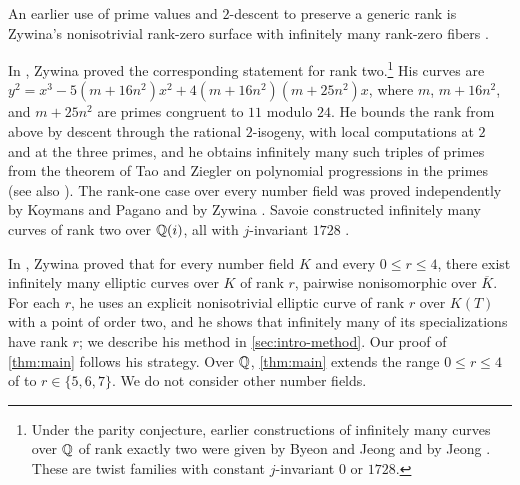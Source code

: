 An earlier use of prime values and $2$-descent to preserve a generic rank is Zywina's nonisotrivial rank-zero surface with infinitely many rank-zero fibers \cite[Theorem~1.2]{ZywinaNoJumps2025}.

In \cite{Zywina2025}, Zywina proved the corresponding statement for rank two.\footnote{Under the parity conjecture, earlier constructions of infinitely many curves over $\mathbb Q$ of rank exactly two were given by Byeon and Jeong \cite[Theorem~1.1]{ByeonJeong2016} and by Jeong \cite[Theorem~1.1]{Jeong2019}. These are twist families with constant $j$-invariant $0$ or $1728$.} His curves are $y^2=x^3-5(m+16n^2)x^2+4(m+16n^2)(m+25n^2)x$, where $m$, $m+16n^2$, and $m+25n^2$ are primes congruent to $11$ modulo $24$. He bounds the rank from above by descent through the rational $2$-isogeny, with local computations at $2$ and at the three primes, and he obtains infinitely many such triples of primes from the theorem of Tao and Ziegler on polynomial progressions in the primes \cite[Theorem~1.3]{TaoZiegler2008} (see also \cite{TaoZieglerErratum2013}). The rank-one case over every number field was proved independently by Koymans and Pagano \cite{KoymansPagano2025} and by Zywina \cite{ZywinaRankOne2025}. Savoie constructed infinitely many curves of rank two over $\mathbb Q(i)$, all with $j$-invariant $1728$ \cite{Savoie2025}.

In \cite[Theorem~1.1]{Zywina2026}, Zywina proved that for every number field $K$ and every $0\le r\le 4$, there exist infinitely many elliptic curves over $K$ of rank $r$, pairwise nonisomorphic over $\overline K$. For each $r$, he uses an explicit nonisotrivial elliptic curve of rank $r$ over $K(T)$ with a point of order two, and he shows that infinitely many of its specializations have rank $r$; we describe his method in \cref{sec:intro-method}. Our proof of \cref{thm:main} follows his strategy. Over $\mathbb Q$, \cref{thm:main} extends the range $0\le r\le 4$ of \cite[Theorem~1.1]{Zywina2026} to $r\in\{5,6,7\}$. We do not consider other number fields.

